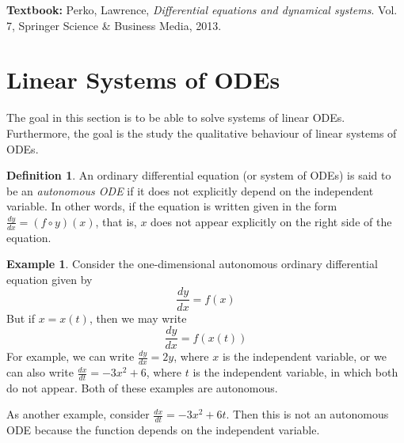 \documentclass[11pt]{amsart}
\theoremstyle{definition}\newtheorem{definition}{Definition}
\theoremstyle{definition}\newtheorem{notation}{Notation}
\theoremstyle{definition}\newtheorem{example}{Example}
\theoremstyle{theorem}\newtheorem{theorem}{Theorem}
\theoremstyle{theorem}\newtheorem{corollary}{Corollary}
\theoremstyle{theorem}\newtheorem{proposition}{Proposition}
\theoremstyle{theorem}\newtheorem{lemma}{Lemma}
\theoremstyle{theorem}\newtheorem{question}{Question}
\theoremstyle{remark}\newtheorem{remark}{Remark}
\begin{document}
\textbf{Textbook:} Perko, Lawrence, \emph{Differential equations and dynamical systems}. Vol. 7, Springer Science \& Business Media, 2013.

\section{Linear Systems of ODEs}

The goal in this section is to be able to solve systems of linear ODEs. Furthermore, the goal is the study the qualitative behaviour of linear systems of ODEs.

\begin{definition}
    An ordinary differential equation (or system of ODEs) is said to be an \emph{autonomous ODE} if it does not explicitly depend on the independent variable. In other words, if the equation is written given in the form $\frac{dy}{dx} = (f \circ y)(x)$, that is, $x$ does not appear explicitly on the right side of the equation.
\end{definition}

\begin{example}
    Consider the one-dimensional autonomous ordinary differential equation given by
    \begin{equation*}
        \frac{dy}{dx} = f(x)
    \end{equation*}
    But if $x = x(t)$, then we may write
    \begin{equation*}
        \frac{dy}{dx} = f(x(t))
    \end{equation*}
    For example, we can write $\frac{dy}{dx} = 2y$, where $x$ is the independent variable, or we can also write $\frac{dx}{dt} = -3x^2 + 6$, where $t$ is the independent variable, in which both do not appear. Both of these examples are autonomous.

    As another example, consider $\frac{dx}{dt} = -3x^2 + 6t$. Then this is not an autonomous ODE because the function depends on the independent variable.
\end{example}
\end{document}
